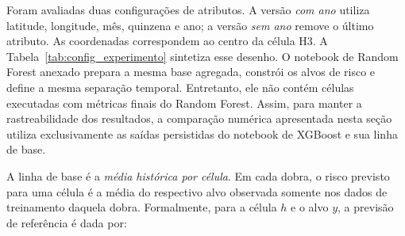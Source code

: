 \documentclass[12pt]{article}
\begin{document}
Foram avaliadas duas configurações de atributos. A versão \textit{com ano} utiliza latitude, longitude, mês, quinzena e ano; a versão \textit{sem ano} remove o último atributo. As coordenadas correspondem ao centro da célula H3. A Tabela~\ref{tab:config_experimento} sintetiza esse desenho. O notebook de Random Forest anexado prepara a mesma base agregada, constrói os alvos de risco e define a mesma separação temporal. Entretanto, ele não contém células executadas com métricas finais do Random Forest. Assim, para manter a rastreabilidade dos resultados, a comparação numérica apresentada nesta seção utiliza exclusivamente as saídas persistidas do notebook de XGBoost e sua linha de base.

\begin{table}[!htbp]
\centering
\caption{Configuração do experimento reprodutível a partir dos notebooks}
\label{tab:config_experimento}
\small
\renewcommand{\arraystretch}{1.2}
\end{table}

A linha de base é a \textit{média histórica por célula}. Em cada dobra, o risco previsto para uma célula é a média do respectivo alvo observada somente nos dados de treinamento daquela dobra. Formalmente, para a célula $h$ e o alvo $y$, a previsão de referência é dada por:
\end{document}
